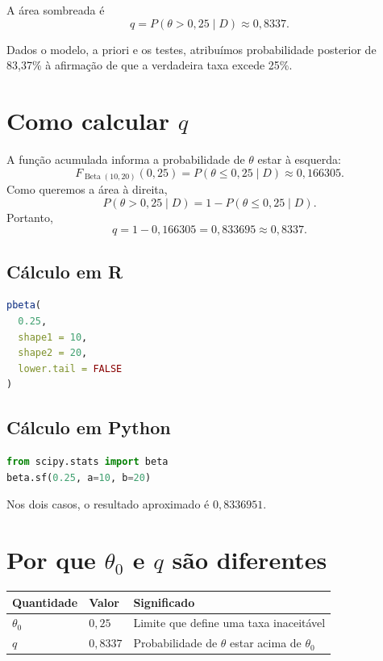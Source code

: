 \documentclass[11pt,letter]{article}
\begin{document}
A área sombreada é
\[
q=P(\theta>0{,}25\mid D)\approx0{,}8337.
\]

\begin{ideia}
Dados o modelo, a priori e os testes, atribuímos probabilidade posterior de
83,37\% à afirmação de que a verdadeira taxa excede 25\%.
\end{ideia}

\section{Como calcular $q$}

A função acumulada informa a probabilidade de $\theta$ estar à esquerda:
\[
F_{\operatorname{Beta}(10,20)}(0{,}25)
=P(\theta\leq0{,}25\mid D)
\approx0{,}166305.
\]
Como queremos a área à direita,
\[
P(\theta>0{,}25\mid D)=1-P(\theta\leq0{,}25\mid D).
\]
Portanto,
\[
q=1-0{,}166305=0{,}833695\approx0{,}8337.
\]

\subsection{Cálculo em R}

\begin{lstlisting}[language=R]
pbeta(
  0.25,
  shape1 = 10,
  shape2 = 20,
  lower.tail = FALSE
)
\end{lstlisting}

\subsection{Cálculo em Python}

\begin{lstlisting}[language=Python]
from scipy.stats import beta
beta.sf(0.25, a=10, b=20)
\end{lstlisting}

Nos dois casos, o resultado aproximado é $0{,}8336951$.

\section{Por que $\theta_0$ e $q$ são diferentes}

\begin{center}
\begin{tabular}{lll}
\toprule
Quantidade & Valor & Significado \\
\midrule
$\theta_0$ & $0{,}25$ & Limite que define uma taxa inaceitável \\
$q$ & $0{,}8337$ & Probabilidade de $\theta$ estar acima de $\theta_0$ \\
\bottomrule
\end{tabular}
\end{center}
\end{document}

